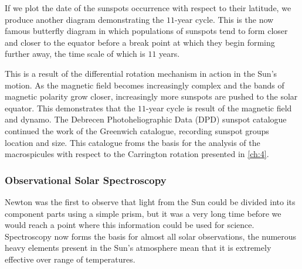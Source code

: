 If we plot the date of the sunspots occurrence with respect to their latitude, we produce another diagram demonstrating the $11$-year cycle.
This is the now famous butterfly diagram in which populations of sunspots tend to form closer and closer to the equator before a break point at which they begin forming further away, the time scale of which is $11$ years.

This is a result of the differential rotation mechanism in action in the Sun's motion.
As the magnetic field becomes increasingly complex and the bands of magnetic polarity grow closer, increasingly more sunspots are pushed to the solar equator.
This demonstrates that the $11$-year cycle is result of the magnetic field and dynamo.
The Debrecen Photoheliographic Data (DPD) sunspot catalogue continued the work of the Greenwich catalogue, recording sunspot groups location and size.
This catalogue froms the basis for the analysis of the macrospicules with respect to the Carrington rotation presented in \ref{ch:4}.


\subsubsection{Observational Solar Spectroscopy}

Newton was the first to observe that light from the Sun could be divided into its component parts using a simple prism, but it was a very long time before we would reach a point where this information could be used for science.
Spectroscopy now forms the basis for almost all solar observations, the numerous heavy elements present in the Sun's atmosphere mean that it is extremely effective over range of temperatures.

